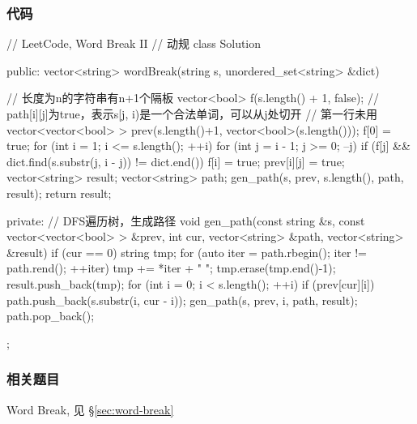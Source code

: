 \subsubsection{代码}
\begin{Code}
// LeetCode, Word Break II
// 动规
class Solution {
public:
    vector<string> wordBreak(string s, unordered_set<string> &dict) {
        // 长度为n的字符串有n+1个隔板
        vector<bool> f(s.length() + 1, false);
        // path[i][j]为true，表示s[j, i)是一个合法单词，可以从j处切开
        // 第一行未用
        vector<vector<bool> > prev(s.length()+1, vector<bool>(s.length()));
        f[0] = true;
        for (int i = 1; i <= s.length(); ++i) {
            for (int j = i - 1; j >= 0; --j) {
                if (f[j] && dict.find(s.substr(j, i - j)) != dict.end()) {
                    f[i] = true;
                    prev[i][j] = true;
                }
            }
        }
        vector<string> result;
        vector<string> path;
        gen_path(s, prev, s.length(), path, result);
        return result;

    }
private:
    // DFS遍历树，生成路径
    void gen_path(const string &s, const vector<vector<bool> > &prev,
            int cur, vector<string> &path, vector<string> &result) {
        if (cur == 0) {
            string tmp;
            for (auto iter = path.rbegin(); iter != path.rend(); ++iter)
                tmp += *iter + " ";
            tmp.erase(tmp.end()-1);
            result.push_back(tmp);
        }
        for (int i = 0; i < s.length(); ++i) {
            if (prev[cur][i]) {
                path.push_back(s.substr(i, cur - i));
                gen_path(s, prev, i, path, result);
                path.pop_back();
            }
        }
    }
};
\end{Code}


\subsubsection{相关题目}
\begindot
\item Word Break, 见 \S \ref{sec:word-break}
\myenddot
